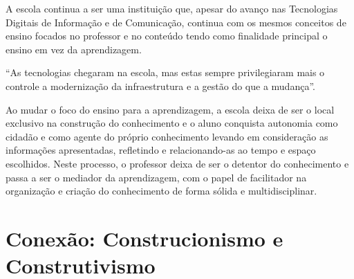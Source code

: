 \documentclass[12pt, openright, a4paper, brazil, english, french, spanish, bibjustif, openany, oneside]{abntex2}
\begin{document}
A escola continua a ser uma instituição que, apesar do avanço nas Tecnologias Digitais de Informação e de Comunicação, continua com os mesmos conceitos de ensino focados no professor e no conteúdo tendo como finalidade principal o ensino em vez da aprendizagem. 

\begin{citacao}

``As tecnologias chegaram na escola, mas estas sempre privilegiaram mais o controle a modernização da infraestrutura e a gestão do que a mudança''\cite{moran}.

\end{citacao}

Ao mudar o foco do ensino para a aprendizagem, a escola deixa de ser o local exclusivo na construção do conhecimento e o aluno conquista autonomia como cidadão e como agente do próprio conhecimento levando em consideração as informações apresentadas, refletindo e relacionando-as ao tempo e espaço escolhidos. Neste processo, o professor deixa de ser o detentor do conhecimento e passa a ser o mediador da aprendizagem, com o papel de facilitador na organização e criação do conhecimento de forma sólida e multidisciplinar. 

\newpage

\section{Conexão: Construcionismo e Construtivismo}


\end{document}
